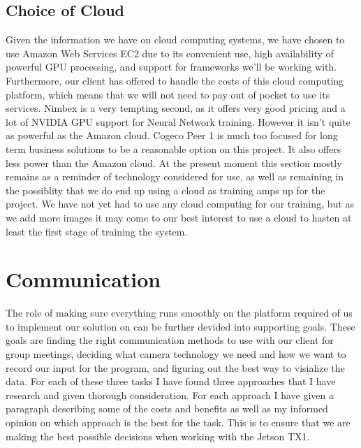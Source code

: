 \subsection{Choice of Cloud}
Given the information we have on cloud computing systems, we have chosen to use Amazon Web Services EC2 due to its convenient use, high availability of powerful GPU processing, and support for frameworks we’ll be working with. 
Furthermore, our client has offered to handle the costs of this cloud computing platform, which means that we will not need to pay out of pocket to use its services. 
Nimbex is a very tempting second, as it offers very good pricing and a lot of NVIDIA GPU support for Neural Network training. However it isn’t quite as powerful as the Amazon cloud. 
Cogeco Peer 1 is much too focused for long term business solutions to be a reasonable option on this project. 
It also offers less power than the Amazon cloud.
\newline\newline
At the present moment this section mostly remains as a reminder of technology considered for use, as well as remaining in the possiblity that we do end up using a cloud as training amps up for the project.
We have not yet had to use any cloud computing for our training, but as we add more images it may come to our best interest to use a cloud to hasten at least the first stage of training the system.

\section{Communication}
The role of making sure everything runs smoothly on the platform required of us to implement our solution on can be further devided into supporting goals.
These goals are finding the right communication methods to use with our client for group meetings, deciding what camera technology we need and how we want to record our input for the program, and figuring out the best way to visialize the data.
For each of these three tasks I have found three approaches that I have research and given thorough consideration.
For each approach I have given a paragraph describing some of the costs and benefits as well as my informed opinion on which approach is the best for the task.
This is to ensure that we are making the best possible decisions when working with the Jetson TX1.

